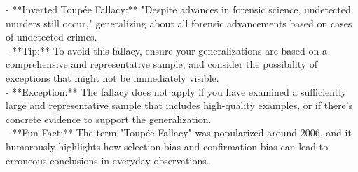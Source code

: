 \documentclass[a4paper,12pt,single,pdftex]{scrbook}
\begin{document}
    
        - **Inverted Toupée Fallacy:** "Despite advances in forensic science, undetected murders still occur," generalizing about all forensic advancements based on cases of undetected crimes.
    \\

    
      - **Tip:** To avoid this fallacy, ensure your generalizations are based on a comprehensive and representative sample, and consider the possibility of exceptions that might not be immediately visible.
    \\

    
      - **Exception:** The fallacy does not apply if you have examined a sufficiently large and representative sample that includes high-quality examples, or if there's concrete evidence to support the generalization.
    \\

    
      - **Fun Fact:** The term "Toupée Fallacy" was popularized around 2006, and it humorously highlights how selection bias and confirmation bias can lead to erroneous conclusions in everyday observations.
    \\
\end{document}
